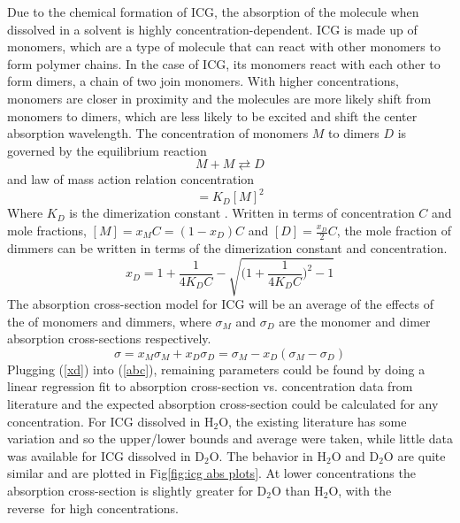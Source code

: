 Due to the chemical formation of ICG, the absorption of the molecule when dissolved in a solvent is highly concentration-dependent. ICG is made up of monomers, which are a type of molecule that can react with other monomers to form polymer chains. In the case of ICG, its monomers react with each other to form dimers, a chain of two join monomers. With higher concentrations, monomers are closer in proximity and the molecules are more likely shift from monomers to dimers, which are less likely to be excited and shift the center absorption wavelength. The concentration of monomers $M$ to dimers $D$ is governed by the equilibrium reaction
\begin{equation}
	M+M\rightleftarrows D
\end{equation}
and law of mass action relation concentration 
\begin{equation}
	[D] =  K_D[M]^2
\end{equation}
Where $K_D$ is the dimerization constant . Written in terms of concentration $C$ and mole fractions, $[M] = x_MC= (1-x_D)C $ and $[D]=\frac{x_D}{2}C$, the  mole fraction of dimmers can be written in terms of the dimerization constant and concentration.
\begin{equation}
	x_D = 1 + \frac{1}{4K_DC} - \sqrt{\big( 1 + \frac{1}{4K_DC}\big)^2-1}
	\label{xd}
\end{equation}
 The absorption cross-section model for ICG\cite{mauerer, philip} will be an average of the effects of the of monomers and dimmers, where $\sigma_M$ and $\sigma_D$ are the monomer and dimer absorption cross-sections respectively.
\begin{equation}
	\sigma = x_M \sigma_M + x_D \sigma_D = \sigma_M - x_D(\sigma_M - \sigma_D)
	\label{abc}
\end{equation}
Plugging (\ref{xd}) into (\ref{abc}), remaining parameters could be found by doing a linear regression fit to absorption cross-section vs. concentration data from literature and the expected absorption cross-section could be calculated for any concentration. For ICG dissolved in H${}_2$O, the existing literature has some variation and so the upper/lower bounds and average were taken, while little data was available for ICG dissolved in D${}_2$O. The behavior in H${}_2$O and D${}_2$O are quite similar and are plotted in Fig\ref{fig:icg abs plots}. At lower concentrations the absorption cross-section is slightly greater for D${}_2$O than H${}_2$O, with the reverse for high concentrations. 
\clearpage
